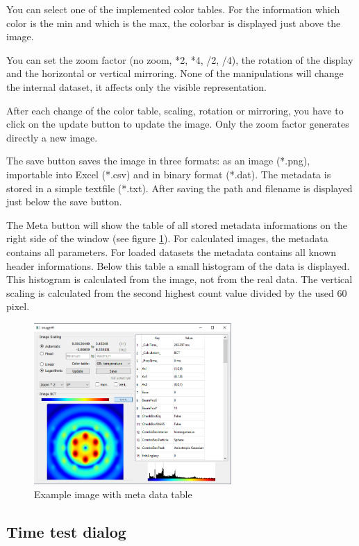 \documentclass[11pt]{article} %
\begin{document}
You can select one of the implemented color tables. For the information which color is the min and which is the max, the colorbar is displayed just above the image.

You can set the zoom factor (no zoom, *2, *4, /2, /4), the rotation of the display and the horizontal or vertical mirroring. None of the manipulations will change the internal dataset, it affects only the visible representation.

After each change of the color table, scaling, rotation or mirroring, you have to click on the update button to update the image. Only the zoom factor generates directly a new image.

The save button saves the image in three formats: as an image (*.png), importable into Excel (*.csv) and in binary format (*.dat). The metadata is stored in a simple textfile (*.txt). After saving the path and filename is displayed just below the save button.

The Meta button will show the table of all stored metadata informations on the right side of the window (see figure \ref{fig:imagemeta}). For calculated images, the metadata contains all parameters. For loaded datasets the metadata contains all known header informations. Below this table a small histogram of the data is displayed. This histogram is calculated from the image, not from the real data. The vertical scaling is calculated from the second highest count value divided by the used 60 pixel.
\begin{figure}[H]
 \centering
 \includegraphics[width=0.67\textwidth]{img-bct-meta.png}
 \caption{Example image with meta data table}
 \label{fig:imagemeta}
\end{figure}


\subsection{Time test dialog}
\end{document}
